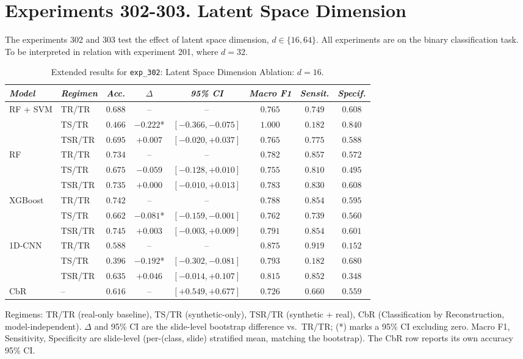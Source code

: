 \newpage
\section*{Experiments 302-303. Latent Space Dimension}
The experiments 302 and 303 test the effect of latent space dimension, $d \in \{16,64\}$. All experiments are on the binary classification task. To be interpreted in relation with experiment 201, where $d=32$.

\begin{table}[htp]
\centering
\scriptsize
\caption{Extended results for \texttt{exp\_302}: Latent Space Dimension Ablation: $d=16$.}
\label{tab:appendix_exp_302}
\begin{tabular*}{\textwidth}{@{\extracolsep{\fill}}llcccccc}
\toprule
\emph{Model} & \emph{Regimen} & \emph{Acc.} & \emph{$\Delta$} & \emph{95\% CI} & \emph{Macro F1} & \emph{Sensit.} & \emph{Specif.}\\
\midrule
\multirow{3}{*}{RF + SVM} & TR/TR & $0.688$ & -- & -- & $0.765$ & $0.749$ & $0.608$\\
 & TS/TR & $0.466$ & $-0.222$* & $[-0.366, -0.075]$ & $1.000$ & $0.182$ & $0.840$\\
 & TSR/TR & $0.695$ & $+0.007$ & $[-0.020, +0.037]$ & $0.765$ & $0.775$ & $0.588$\\
\midrule
\multirow{3}{*}{RF} & TR/TR & $0.734$ & -- & -- & $0.782$ & $0.857$ & $0.572$\\
 & TS/TR & $0.675$ & $-0.059$ & $[-0.128, +0.010]$ & $0.755$ & $0.810$ & $0.495$\\
 & TSR/TR & $0.735$ & $+0.000$ & $[-0.010, +0.013]$ & $0.783$ & $0.830$ & $0.608$\\
\midrule
\multirow{3}{*}{XGBoost} & TR/TR & $0.742$ & -- & -- & $0.788$ & $0.854$ & $0.595$\\
 & TS/TR & $0.662$ & $-0.081$* & $[-0.159, -0.001]$ & $0.762$ & $0.739$ & $0.560$\\
 & TSR/TR & $0.745$ & $+0.003$ & $[-0.003, +0.009]$ & $0.791$ & $0.854$ & $0.601$\\
\midrule
\multirow{3}{*}{1D-CNN} & TR/TR & $0.588$ & -- & -- & $0.875$ & $0.919$ & $0.152$\\
 & TS/TR & $0.396$ & $-0.192$* & $[-0.302, -0.081]$ & $0.793$ & $0.182$ & $0.680$\\
 & TSR/TR & $0.635$ & $+0.046$ & $[-0.014, +0.107]$ & $0.815$ & $0.852$ & $0.348$\\
\midrule
CbR & -- & $0.616$ & -- & $[+0.549, +0.677]$ & $0.726$ & $0.660$ & $0.559$\\
\bottomrule
\end{tabular*}
\small{Regimens: TR/TR (real-only baseline), TS/TR (synthetic-only), TSR/TR (synthetic + real), CbR (Classification by Reconstruction, model-independent). $\Delta$ and 95\% CI are the slide-level bootstrap difference vs.\ TR/TR; (*) marks a 95\% CI excluding zero. Macro F1, Sensitivity, Specificity are slide-level (per-(class, slide) stratified mean, matching the bootstrap). The CbR row reports its own accuracy 95\% CI.}
\end{table}

